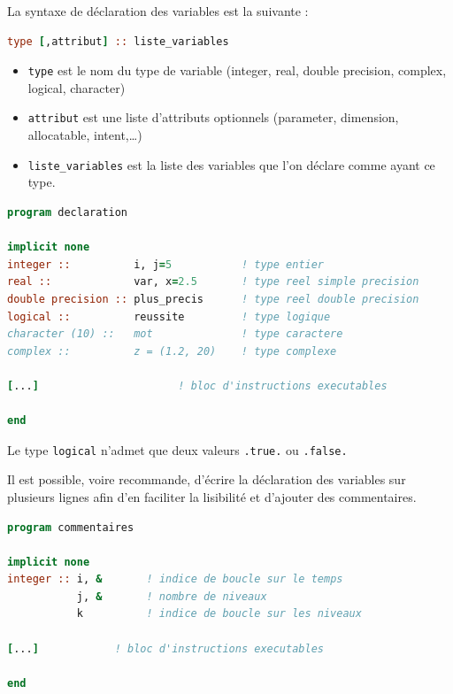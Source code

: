 \documentclass[a4paper,twoside]{article}
\begin{document}
La syntaxe de déclaration des variables est la suivante : 
\begin{lstlisting}[language=Fortran]
type [,attribut] :: liste_variables
\end{lstlisting}
\begin{itemize}
\item \texttt{type} est le nom du type de variable (integer, real, double precision, complex, logical, character)
\item \texttt{attribut} est une liste d'attributs optionnels (parameter, dimension, allocatable, intent,\dots)
\item \texttt{liste\_variables} est la liste des variables que l'on déclare comme ayant ce type.
\end{itemize}

\begin{exemple}
\begin{lstlisting}[language=Fortran]
program declaration
       
implicit none          
integer ::          i, j=5           ! type entier
real ::             var, x=2.5       ! type reel simple precision 
double precision :: plus_precis      ! type reel double precision 
logical ::          reussite         ! type logique 
character (10) ::   mot              ! type caractere
complex ::          z = (1.2, 20)    ! type complexe
   
[...]                      ! bloc d'instructions executables
      
end
\end{lstlisting}
\end{exemple}

Le type \texttt{logical} n'admet que deux valeurs \texttt{.true.} ou \texttt{.false.}

\begin{remarque}
Il est possible, voire recommande, d'écrire la déclaration des variables sur plusieurs lignes afin d'en faciliter la lisibilité et d'ajouter des commentaires.

\begin{lstlisting}[language=Fortran]
program commentaires 
 
implicit none
integer :: i, &       ! indice de boucle sur le temps
           j, &       ! nombre de niveaux  
           k          ! indice de boucle sur les niveaux 
    
[...]            ! bloc d'instructions executables
  
end
\end{lstlisting}
\end{remarque}
\end{document}
